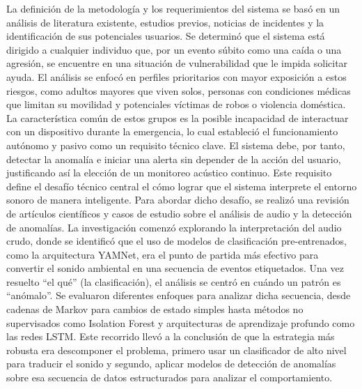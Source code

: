 

La definición de la metodología y los requerimientos del sistema se basó en un análisis de literatura existente, estudios previos, noticias de incidentes y la identificación de sus potenciales usuarios. Se determinó que el sistema está dirigido a cualquier individuo que, por un evento súbito como una caída o una agresión, se encuentre en una situación de vulnerabilidad que le impida solicitar ayuda. El análisis se enfocó en perfiles prioritarios con mayor exposición a estos riesgos, como adultos mayores que viven solos, personas con condiciones médicas que limitan su movilidad y potenciales víctimas de robos o violencia doméstica. La característica común de estos grupos es la posible incapacidad de interactuar con un dispositivo durante la emergencia, lo cual estableció el funcionamiento autónomo y pasivo como un requisito técnico clave. El sistema debe, por tanto, detectar la anomalía e iniciar una alerta sin depender de la acción del usuario, justificando así la elección de un monitoreo acústico continuo. Este requisito define el desafío técnico central el cómo lograr que el sistema interprete el entorno sonoro de manera inteligente. Para abordar dicho desafío, se realizó una revisión de artículos científicos y casos de estudio sobre el análisis de audio y la detección de anomalías. La investigación comenzó explorando la interpretación del audio crudo, donde se identificó que el uso de modelos de clasificación pre-entrenados, como la arquitectura YAMNet, era el punto de partida más efectivo para convertir el sonido ambiental en una secuencia de eventos etiquetados. Una vez resuelto ``el qué'' (la clasificación), el análisis se centró en cuándo un patrón es ``anómalo''. Se evaluaron diferentes enfoques para analizar dicha secuencia, desde cadenas de Markov para cambios de estado simples hasta métodos no supervisados como Isolation Forest y arquitecturas de aprendizaje profundo como las redes LSTM. Este recorrido llevó a la conclusión de que la estrategia más robusta era descomponer el problema, primero usar un clasificador de alto nivel para traducir el sonido y segundo, aplicar modelos de detección de anomalías sobre esa secuencia de datos estructurados para analizar el comportamiento.

